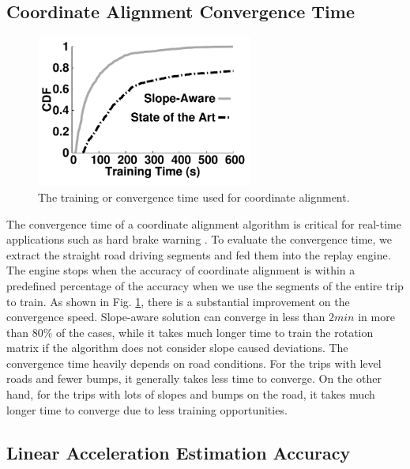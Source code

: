\subsection{Coordinate Alignment Convergence Time}

\begin{figure}[!htbp]
\begin{center}
\includegraphics[width=2.8in,angle=0]{Figs/SlopeAware/alignment.pdf}
\vspace{0.0cm}
\caption{The training or convergence time used for coordinate alignment.}
\label{alignmenttime}
\vspace{-0.2cm}
\end{center}
\end{figure}

The convergence time of a coordinate alignment algorithm is critical
for real-time applications such as hard brake warning \cite{snapshot}. 
To evaluate the convergence time, we extract the straight road driving segments and fed them into the replay engine.
The engine stops when the accuracy of coordinate alignment is within
a predefined percentage of the accuracy when we use the segments of the entire trip to train.
As shown in Fig. \ref{alignmenttime}, 
there is a substantial improvement on the convergence speed.
Slope-aware solution can converge in less than $2min$ in more than
$80\%$ of the cases, 
while it takes much longer time to train the rotation matrix if
the algorithm does not consider slope caused deviations.
The convergence time heavily depends on road conditions. 
For the trips with level roads and fewer bumps, it generally
takes less time to converge.
On the other hand, for the trips with lots of slopes and bumps on the road, 
it takes much longer time to converge due to less training opportunities.


\subsection{Linear Acceleration Estimation Accuracy}

